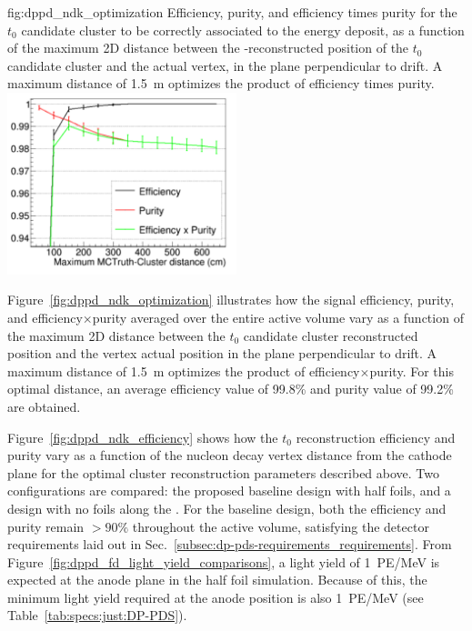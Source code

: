 \begin{dunefigure}{fig:dppd_ndk_optimization}
{Efficiency, purity, and efficiency times purity for the $t_0$ candidate cluster to be correctly associated to the  energy deposit, as a function of the maximum 2D distance between the -reconstructed position of the $t_0$ candidate cluster and the actual  vertex, in the plane perpendicular to drift. A maximum distance of \SI{1.5}{\m} optimizes the product of efficiency times purity.}
\includegraphics[width=0.5\textwidth]{graphics/dppd_ndk_optimization.pdf}
\end{dunefigure}

Figure~\ref{fig:dppd_ndk_optimization} illustrates how the  signal efficiency, purity, and efficiency$\times$purity averaged over the entire  active volume vary as a function of the maximum 2D distance between the $t_0$ candidate cluster reconstructed position and the  vertex actual position in the plane perpendicular to drift. A maximum distance of \SI{1.5}{\m} optimizes the product of efficiency$\times$purity. For this optimal distance, an average efficiency value of \num{99.8}\% and purity value of \num{99.2}\% are obtained.  

Figure~\ref{fig:dppd_ndk_efficiency} shows how the  $t_0$ reconstruction efficiency and purity vary as a function of the nucleon decay vertex distance from the cathode plane for the optimal cluster reconstruction parameters described above. Two configurations are compared: the proposed baseline design with half foils, and a design with no foils along the . For the baseline design, both the efficiency and purity remain $>90\%$ throughout the  active volume, satisfying the detector requirements laid out in Sec.~\ref{subsec:dp-pds-requirements_requirements}. From Figure~\ref{fig:dppd_fd_light_yield_comparisons}, a light yield of \SI{1}{PE/\MeV} is expected at the anode plane in the half foil simulation. Because of this, the  minimum light yield required at the anode position is also \SI{1}{PE/\MeV} (see Table~\ref{tab:specs:just:DP-PDS}). 

